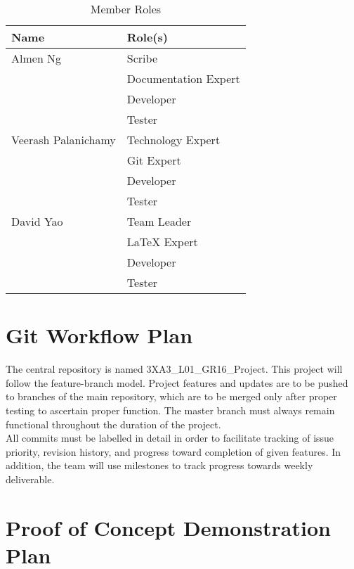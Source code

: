 \documentclass[12pt,letterpaper]{article}
\begin{document}
\begin{table}[hbt!]
    \centering
    \begin{tabularx}{\textwidth}{|X|X|}
        \toprule
        \textbf{Name} & \textbf{Role(s)}\\
        \midrule
        Almen Ng                    & Scribe\\
                                    & Documentation Expert\\
                                    & Developer\\
                                    & Tester\\
        Veerash Palanichamy         & Technology Expert\\
                                    & Git Expert\\
                                    & Developer\\
                                    & Tester\\
        David Yao                   & Team Leader\\
                                    & LaTeX Expert\\
                                    & Developer\\
                                    & Tester\\
        \bottomrule
    \end{tabularx}
\caption{Member Roles} \label{tab:memberRoles}
\end{table}

\newpage

\section{Git Workflow Plan}
The central repository is named 3XA3\_L01\_GR16\_Project. This project will follow the feature-branch model. Project features and updates are to be pushed to branches of the main repository, which are to be merged only after proper testing to ascertain proper function. The master branch must always remain functional throughout the duration of the project.\\
All commits must be labelled in detail in order to facilitate tracking of issue priority, revision history, and progress toward completion of given features. In addition, the team will use milestones to track progress towards weekly deliverable.

\section{Proof of Concept Demonstration Plan}
\end{document}
